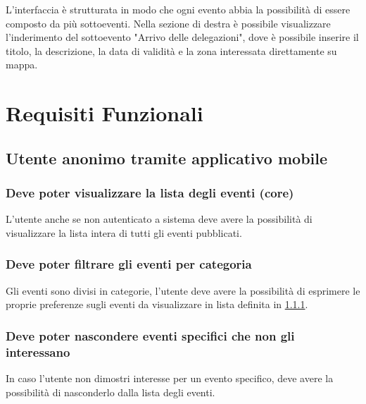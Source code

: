 \documentclass{article}
\begin{document}
L'interfaccia è strutturata in modo che ogni evento abbia la possibilità di essere composto da più sottoeventi. Nella sezione di destra è possibile visualizzare l'inderimento del sottoevento "Arrivo delle delegazioni", dove è possibile inserire il titolo, la descrizione, la data di validità e la zona interessata direttamente su mappa.\\

\clearpage

\section{Requisiti Funzionali}

\subsection{Utente anonimo tramite applicativo mobile}

\subsubsection{Deve poter visualizzare la lista degli eventi (core)}\label{Requirements:Lista}
\label{5.1.1}
L'utente anche se non autenticato a sistema deve avere la possibilità di visualizzare la lista intera di tutti gli eventi pubblicati.

\subsubsection{Deve poter filtrare gli eventi per categoria}
\label{5.1.2}
Gli eventi sono divisi in categorie, l'utente deve avere la possibilità di esprimere le proprie preferenze sugli eventi da visualizzare in lista definita in \ref{Requirements:Lista}.

\subsubsection{Deve poter nascondere eventi specifici che non gli interessano}
\label{5.1.3}
In caso l'utente non dimostri interesse per un evento specifico, deve avere la possibilità di nasconderlo dalla lista degli eventi.
\end{document}

